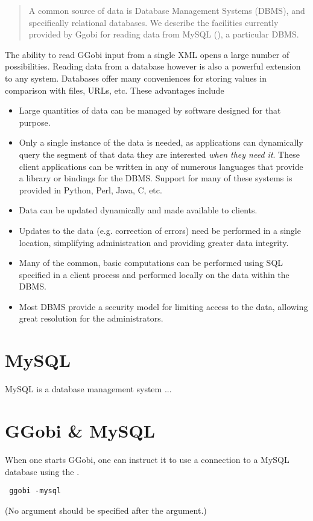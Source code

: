 \documentclass{article}
\begin{document}
\begin{abstract}
  A common source of data is Database Management Systems (DBMS), and
  specifically relational databases.  We describe the facilities
  currently provided by Ggobi for reading data from MySQL
  (), a particular DBMS.
\end{abstract}

The ability to read GGobi input from a single XML opens a large number
of possibilities.  Reading data from a database however is also a
powerful extension to any system.  Databases offer many conveniences
for storing values in comparison with files, URLs, etc.
These advantages include
\begin{itemize}

\item Large quantities of data can be managed by software
 designed for that purpose. 

\item Only a single instance of the data is needed, as applications
  can dynamically query the segment of that data they are interested
  \textsl{when they need it}.  These client applications can be
  written in any of numerous languages that provide a library or
  bindings for the DBMS.  Support for many of these systems is
  provided in Python, Perl, Java, C, etc.

\item Data can be updated dynamically and made available to clients.

\item Updates to the data (e.g. correction of errors) need be
  performed in a single location, simplifying administration
and providing greater data integrity.

\item Many of the common, basic computations can be performed
using SQL specified in a client process and performed locally on the
data within the DBMS.

\item Most DBMS provide a security model for limiting access
to the data, allowing great resolution for the administrators.

\end{itemize}


\section{MySQL}
MySQL is a database management system ...

\section{GGobi \& MySQL}
When one starts GGobi, one can instruct it
to use a connection to a MySQL database
using the .
\begin{verbatim}
 ggobi -mysql
\end{verbatim}
(No argument should be specified after the 
 argument.)
\end{document}
